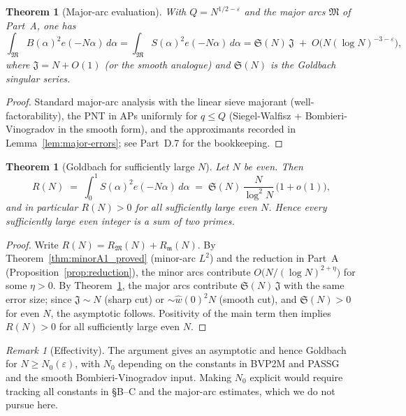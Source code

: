 \documentclass[11pt]{article}
\newtheorem{theorem}[lemma]{Theorem}
\theoremstyle{definition}
\theoremstyle{remark}
\newtheorem{remark}[lemma]{Remark}
\numberwithin{equation}{part}
\begin{document}
\begin{theorem}[Major-arc evaluation]\label{thm:major-eval}
	With $Q=N^{1/2-\varepsilon}$ and the major arcs $\mathfrak M$ of Part~A, one has
	\[
		\int_{\mathfrak M} B(\alpha)^2 e(-N\alpha)\,d\alpha
		=\int_{\mathfrak M} S(\alpha)^2 e(-N\alpha)\,d\alpha
		=\mathfrak S(N)\,\mathfrak J\;+\;O\!\big(N(\log N)^{-3-\varepsilon}\big),
	\]
	where $\mathfrak J=N+O(1)$ (or the smooth analogue) and $\mathfrak S(N)$ is the Goldbach singular series.
\end{theorem}

\begin{proof}
	Standard major-arc analysis with the linear sieve majorant (well-factorability), the PNT in APs uniformly for $q\le Q$ (Siegel-Walfisz + Bombieri-Vinogradov in the smooth form), and the approximants recorded in Lemma~\ref{lem:major-errors}; see Part~D.7 for the bookkeeping.
\end{proof}

\begin{theorem}[Goldbach for sufficiently large $N$]\label{thm:goldbach_final}
	Let $N$ be even. Then
	\[
		R(N)\;=\;\int_0^1 S(\alpha)^2 e(-N\alpha)\,d\alpha
		\;=\;\mathfrak S(N)\,\frac{N}{\log^2 N}\,\bigl(1+o(1)\bigr),
	\]
	and in particular $R(N)>0$ for all sufficiently large even $N$. Hence every sufficiently large even integer is a sum of two primes.
\end{theorem}

\begin{proof}
	Write $R(N)=R_{\mathfrak M}(N)+R_{\mathfrak m}(N)$.
	By Theorem~\ref{thm:minorA1_proved} (minor-arc $L^2$) and the reduction in Part~A (Proposition~\ref{prop:reduction}), the minor arcs contribute $O\big(N/(\log N)^{2+\eta}\big)$ for some $\eta>0$.
	By Theorem~\ref{thm:major-eval}, the major arcs contribute $\mathfrak S(N)\,\mathfrak J$ with the same error size; since $\mathfrak J\sim N$ (sharp cut) or $\sim \widehat w(0)^2N$ (smooth cut), and $\mathfrak S(N)>0$ for even $N$, the asymptotic follows. Positivity of the main term then implies $R(N)>0$ for all sufficiently large even $N$.
\end{proof}

\begin{remark}[Effectivity]
	The argument gives an asymptotic and hence Goldbach for $N\ge N_0(\varepsilon)$, with $N_0$ depending on the constants in BVP2M and PASSG and the smooth Bombieri-Vinogradov input. Making $N_0$ explicit would require tracking all constants in \S B--C and the major-arc estimates, which we do not pursue here.
\end{remark}
\end{document}
